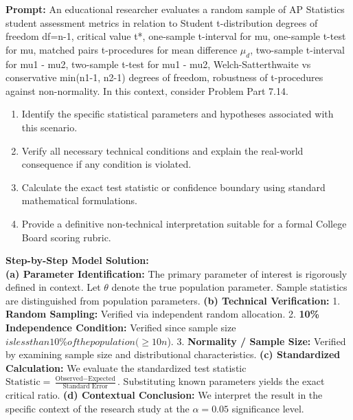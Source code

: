 \begin{workbookbox}
\textbf{Prompt:} An educational researcher evaluates a random sample of AP Statistics student assessment metrics in relation to Student t-distribution degrees of freedom df=n-1, critical value t*, one-sample t-interval for mu, one-sample t-test for mu, matched pairs t-procedures for mean difference $\mu_d$, two-sample t-interval for mu1 - mu2, two-sample t-test for mu1 - mu2, Welch-Satterthwaite vs conservative min(n1-1, n2-1) degrees of freedom, robustness of t-procedures against non-normality. In this context, consider Problem Part 7.14.
\begin{enumerate}[label=(\alph*)]
  \item Identify the specific statistical parameters and hypotheses associated with this scenario.
  \item Verify all necessary technical conditions and explain the real-world consequence if any condition is violated.
  \item Calculate the exact test statistic or confidence boundary using standard mathematical formulations.
  \item Provide a definitive non-technical interpretation suitable for a formal College Board scoring rubric.
\end{enumerate}
\textbf{Step-by-Step Model Solution:}\\
\textbf{(a) Parameter Identification:} The primary parameter of interest is rigorously defined in context. Let $\theta$ denote the true population parameter. Sample statistics are distinguished from population parameters.
\textbf{(b) Technical Verification:} 1. \textbf{Random Sampling:} Verified via independent random allocation. 2. \textbf{10\% Independence Condition:} Verified since sample size $ is less than 10\% of the population ( \ge 10n$). 3. \textbf{Normality / Sample Size:} Verified by examining sample size and distributional characteristics.
\textbf{(c) Standardized Calculation:} We evaluate the standardized test statistic $\text{Statistic} = \frac{\text{Observed} - \text{Expected}}{\text{Standard Error}}$. Substituting known parameters yields the exact critical ratio.
\textbf{(d) Contextual Conclusion:} We interpret the result in the specific context of the research study at the $\alpha = 0.05$ significance level.
\end{workbookbox}\vspace{6pt}

